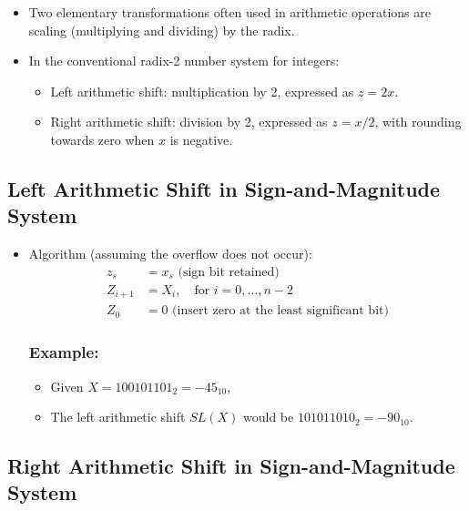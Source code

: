\documentclass[12pt,openany]{book}
\begin{document}
	\begin{itemize}
		\item[] Two elementary transformations often used in arithmetic operations are scaling (multiplying and dividing) by the radix.
		\item[] In the conventional radix-2 number system for integers:
			  \begin{itemize}
				  \item[] Left arithmetic shift: multiplication by 2, expressed as \( z = 2x \).
				  \item[] Right arithmetic shift: division by 2, expressed as \( z = x/2 \), with rounding towards zero when \( x \) is negative.
			  \end{itemize}
	\end{itemize}
	
	\subsection{Left Arithmetic Shift in Sign-and-Magnitude System}
	
	\begin{itemize}
		\item[] Algorithm (assuming the overflow does not occur):
			  \begin{align*}
				  z_s     & = x_s \text{ (sign bit retained)}                      \\
				  Z_{i+1} & = X_i, \quad \text{for } i = 0, \ldots, n-2            \\
				  Z_0     & = 0 \text{ (insert zero at the least significant bit)} 
			  \end{align*}
			  \subsubsection*{Example:}
			  \begin{itemize}
				  \item[] Given \( X = 100101101_2 = -45_{10} \),
				  \item[] The left arithmetic shift \( SL(X) \) would be \( 101011010_2 = -90_{10} \).
			  \end{itemize}
	\end{itemize}
	
	\subsection{Right Arithmetic Shift in Sign-and-Magnitude System}
	
\end{document}
